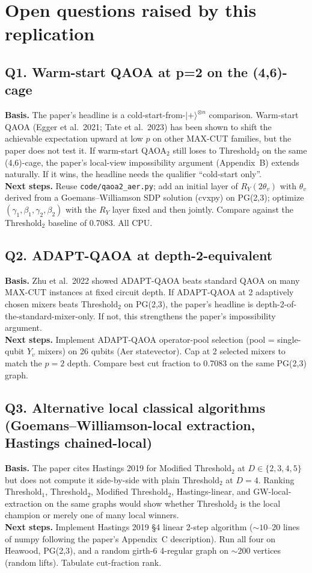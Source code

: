 \section*{Open questions raised by this replication}

\subsection*{Q1. Warm-start QAOA at p=2 on the (4,6)-cage}
\textbf{Basis.} The paper's headline is a cold-start-from-$|+\rangle^{\otimes n}$ comparison. Warm-start QAOA (Egger et al.\ 2021; Tate et al.\ 2023) has been shown to shift the achievable expectation upward at low $p$ on other MAX-CUT families, but the paper does not test it. If warm-start QAOA$_2$ still loses to Threshold$_2$ on the same (4,6)-cage, the paper's local-view impossibility argument (Appendix~B) extends naturally. If it wins, the headline needs the qualifier ``cold-start only''.\\
\textbf{Next steps.} Reuse \texttt{code/qaoa2\_aer.py}; add an initial layer of $R_Y(2\theta_v)$ with $\theta_v$ derived from a Goemans--Williamson SDP solution (cvxpy) on PG(2,3); optimize $(\gamma_1,\beta_1,\gamma_2,\beta_2)$ with the $R_Y$ layer fixed and then jointly. Compare against the Threshold$_2$ baseline of 0.7083. All CPU.

\subsection*{Q2. ADAPT-QAOA at depth-2-equivalent}
\textbf{Basis.} Zhu et al.\ 2022 showed ADAPT-QAOA beats standard QAOA on many MAX-CUT instances at fixed circuit depth. If ADAPT-QAOA at 2 adaptively chosen mixers beats Threshold$_2$ on PG(2,3), the paper's headline is depth-2-of-the-standard-mixer-only. If not, this strengthens the paper's impossibility argument.\\
\textbf{Next steps.} Implement ADAPT-QAOA operator-pool selection (pool = single-qubit $Y_v$ mixers) on 26 qubits (Aer statevector). Cap at 2 selected mixers to match the $p{=}2$ depth. Compare best cut fraction to 0.7083 on the same PG(2,3) graph.

\subsection*{Q3. Alternative local classical algorithms (Goemans--Williamson-local extraction, Hastings chained-local)}
\textbf{Basis.} The paper cites Hastings 2019 for Modified Threshold$_2$ at $D\!\in\!\{2,3,4,5\}$ but does not compute it side-by-side with plain Threshold$_2$ at $D{=}4$. Ranking Threshold$_1$, Threshold$_2$, Modified Threshold$_2$, Hastings-linear, and GW-local-extraction on the same graphs would show whether Threshold$_2$ is the local champion or merely one of many local winners.\\
\textbf{Next steps.} Implement Hastings 2019 \S4 linear 2-step algorithm ($\sim 10$--20 lines of numpy following the paper's Appendix~C description). Run all four on Heawood, PG(2,3), and a random girth-6 4-regular graph on $\sim 200$ vertices (random lifts). Tabulate cut-fraction rank.

